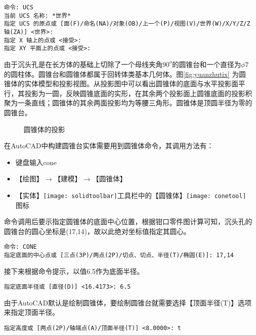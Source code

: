 \begin{procedure}
\begin{lstlisting}
命令: UCS
当前 UCS 名称: *世界*
指定 UCS 的原点或 [面(F)/命名(NA)/对象(OB)/上一个(P)/视图(V)/世界(W)/X/Y/Z/Z 轴(ZA)] <世界>:
指定 X 轴上的点或 <接受>:
指定 XY 平面上的点或 <接受>:
\end{lstlisting}

由于沉头孔是在长方体的基础上切除了一个母线夹角$90^o$的圆锥台和一个直径为$\phi 7$的圆柱体。圆锥台和圆锥体都属于回转体类基本几何体。图\ref{fig:yuanzhutix} 为圆锥体的实体模型和投影视图。从投影图中可以看出圆锥体的底面与水平投影面平行，其投影为一圆，反映圆锥底面的实形，在其余两个投影面上圆锥底面的投影积聚为一条直线；圆锥体的其余两面投影均为等腰三角形。圆锥体是顶圆半径为零的圆锥台。

\begin{figure}[htbp]
\centering
{}\hspace{30pt}
\caption{圆锥体的投影}\label{fig:yuanzhuiti}
\end{figure}

在AutoCAD中构建圆锥台实体需要用到圆锥体命令，其调用方法有：
\begin{itemize}
\item 键盘输入cone
\item 【绘图】$\rightarrow $【建模】$\rightarrow $【圆锥体】
\item 【实体】\texttt{[image: solidtoolbar]}工具栏中的【圆锥体】\texttt{[image: conetool]}图标
\end{itemize}

命令调用后要示指定圆锥体的底面中心位置，根据钳口零件图计算可知，沉头孔的圆锥台的圆心坐标是(17,14)，故以此绝对坐标值指定其圆心。

\begin{lstlisting}
命令: CONE
指定底面的中心点或 [三点(3P)/两点(2P)/切点、切点、半径(T)/椭圆(E)]: 17,14
\end{lstlisting}

接下来根据命令提示，以值6.5作为底面半径。

\begin{lstlisting}
指定底面半径或 [直径(D)] <16.4173>: 6.5
\end{lstlisting}

由于AutoCAD默认是绘制圆锥体，要绘制圆锥台就需要选择【顶面半径(T)】选项来指定顶面半径。

\begin{lstlisting}
指定高度或 [两点(2P)/轴端点(A)/顶面半径(T)] <8.0000>: t
\end{lstlisting}


\end{procedure}
